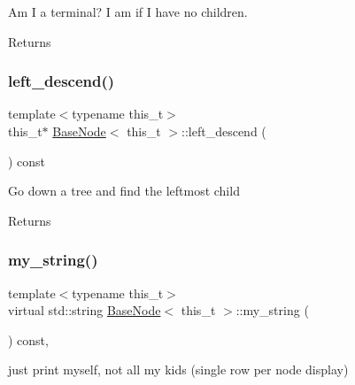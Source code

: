 Am I a terminal? I am if I have no children. \begin{DoxyReturn}{Returns}

\end{DoxyReturn}
\mbox{\label{class_base_node_ad319f28caf14e730bc62560f1bd682b6}} 
\subsubsection{\texorpdfstring{left\+\_\+descend()}{left\_descend()}}
{\footnotesize\ttfamily template$<$typename this\+\_\+t$>$ \\
this\+\_\+t$\ast$ \hyperlink{class_base_node}{Base\+Node}$<$ this\+\_\+t $>$\+::left\+\_\+descend (\begin{DoxyParamCaption}{ }\end{DoxyParamCaption}) const\hspace{0.3cm}{\ttfamily [inline]}}

Go down a tree and find the leftmost child \begin{DoxyReturn}{Returns}

\end{DoxyReturn}
\mbox{\label{class_base_node_a263b93d5aaf1ce5eb7f103bf3b988db3}} 
\subsubsection{\texorpdfstring{my\+\_\+string()}{my\_string()}}
{\footnotesize\ttfamily template$<$typename this\+\_\+t$>$ \\
virtual std\+::string \hyperlink{class_base_node}{Base\+Node}$<$ this\+\_\+t $>$\+::my\+\_\+string (\begin{DoxyParamCaption}{ }\end{DoxyParamCaption}) const\hspace{0.3cm}{\ttfamily [inline]}, {\ttfamily [virtual]}}

just print myself, not all my kids (single row per node display) \mbox{\label{class_base_node_abae4d16401a958dc41d2852dedcf0721}} 
